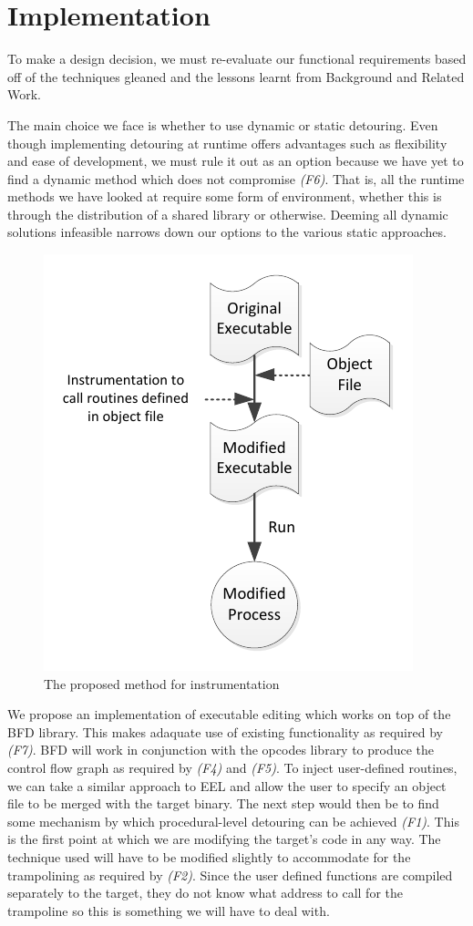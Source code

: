 \chapter{Implementation}

To make a design decision, we must re-evaluate our functional requirements based off of the techniques gleaned and the lessons learnt from Background and Related Work.

The main choice we face is whether to use dynamic or static detouring. Even though implementing detouring at runtime offers advantages such as flexibility and ease of development, we must rule it out as an option because we have yet to find a dynamic method which does not compromise \emph{(F6)}. That is, all the runtime methods we have looked at require some form of environment, whether this is through the distribution of a shared library or otherwise. Deeming all dynamic solutions infeasible narrows down our options to the various static approaches.

\begin{figure}[H]
 \centering
 \includegraphics{Workflow.pdf}
 \caption[Hierarchy]{The proposed method for instrumentation}
\end{figure}

We propose an implementation of executable editing which works on top of the BFD library. This makes adaquate use of existing functionality as required by \emph{(F7)}. BFD will work in conjunction with the opcodes library to produce the control flow graph as required by \emph{(F4)} and \emph{(F5)}. To inject user-defined routines, we can take a similar approach to EEL and allow the user to specify an object file to be merged with the target binary. The next step would then be to find some mechanism by which procedural-level detouring can be achieved \emph{(F1)}. This is the first point at which we are modifying the target's code in any way. The technique used will have to be modified slightly to accommodate for the trampolining as required by \emph{(F2)}. Since the user defined functions are compiled separately to the target, they do not know what address to call for the trampoline so this is something we will have to deal with.

